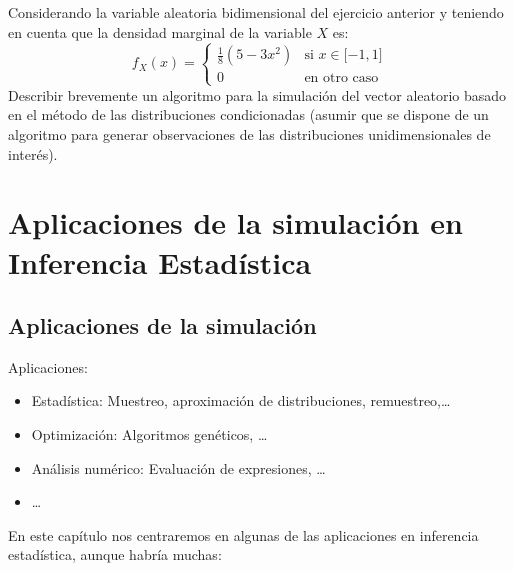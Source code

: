 \documentclass[]{book}
\theoremstyle{definition}
\theoremstyle{definition}
\theoremstyle{definition}
\theoremstyle{remark}
\let\BeginKnitrBlock\begin \let\EndKnitrBlock\end
\begin{document}
\BeginKnitrBlock{exercise}
\protect\hypertarget{exr:unnamed-chunk-56}{}{\label{exr:unnamed-chunk-56} }
\EndKnitrBlock{exercise}

Considerando la variable aleatoria bidimensional del ejercicio anterior
y teniendo en cuenta que la densidad marginal de la variable \(X\) es:
\[f_{X}(x)=\left\{ 
\begin{array}{cl}
\frac{1}{8}\left( 5-3x^2\right)  & \text{si }x\in \lbrack -1,1] \\ 
0 & \text{en otro caso}
\end{array}
\right.\] Describir brevemente un algoritmo para la simulación del
vector aleatorio basado en el método de las distribuciones condicionadas
(asumir que se dispone de un algoritmo para generar observaciones de las
distribuciones unidimensionales de interés).

\chapter{Aplicaciones de la simulación en Inferencia
Estadística}\label{aplicaciones-de-la-simulacion-en-inferencia-estadistica}

\section{Aplicaciones de la
simulación}\label{aplicaciones-de-la-simulacion}

Aplicaciones:

\begin{itemize}
\item
  Estadística: Muestreo, aproximación de distribuciones,
  remuestreo,\ldots{}
\item
  Optimización: Algoritmos genéticos, \ldots{}
\item
  Análisis numérico: Evaluación de expresiones, \ldots{}
\item
  \ldots{}
\end{itemize}

En este capítulo nos centraremos en algunas de las aplicaciones en
inferencia estadística, aunque habría muchas:
\end{document}

